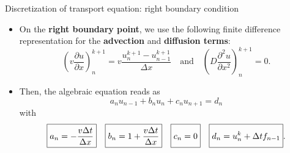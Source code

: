 %
%
\begin{frame}{Discretization of transport equation: right boundary condition}

\begin{itemize}
\item On the \alert{\bf right boundary point}, we use the following finite difference representation for the \textbf{advection} and  \textbf{diffusion terms}:
\[
\left(v\frac{\partial u}{\partial x}\right)_{n}^{k+1}=v\frac{u_{n}^{k+1}-u_{n-1}^{k+1}}{\Delta x} 
\quad \mbox{and} \quad
\left(D\frac{\partial^{2}u}{\partial x^{2}}\right)_{n}^{k+1}=0.
\]
\item Then, the algebraic equation reads as
\[
a_{n}u_{n-1} + b_{n}u_{n} + c_{n}u_{n+1} =d_{n}
\]
with
\[
\boxed{a_{n}=-\frac{v\Delta t}{\Delta x}}\quad\boxed{b_{n}=1+\frac{v\Delta t}{\Delta x}}\quad\boxed{c_{n}=0\vphantom{\frac{D\Delta t}{\Delta x^{2}}}}\quad\boxed{d_{n}=u_{n}^{k}+\Delta tf_{n-1}\vphantom{\frac{D\Delta t}{\Delta x^{2}}}}.
\]
\end{itemize}
\end{frame}
%
%
